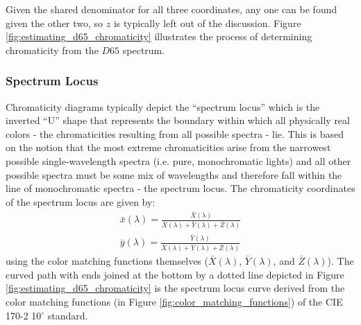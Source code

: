 \documentclass[twocolumn]{article}
\newif\ifinvert
\begin{document}
Given the shared denominator for all three coordinates, any one can be found given the other two, so $z$ is typically left out of the discussion.  Figure \ref{fig:estimating_d65_chromaticity} illustrates the process of determining chromaticity from the $D65$ spectrum.
\begin{figure*}[h]
    \ifinvert
        
    \else
        
    \fi
    \caption{Illustration of the estimation of chromaticity from a spectrum.  The three left panels show the products of the three color matching functions with the $D65$ spectrum.  The area shaded under each resulting curve is annotated within each panel by applying equation \ref{eq:tristimulus_from_spectrum}.  The right panel shows the resulting chromaticity coordinate $(x,y)$ for the CIE 170-2 10$^\circ$ space (slightly different from the typically used CIE 1931).  IMAGE LINK, CODE LINK}\label{fig:estimating_d65_chromaticity}
\end{figure*}
\subsubsection{Spectrum Locus}
Chromaticity diagrams typically depict the “spectrum locus” which is the inverted “U” shape that represents the boundary within which all physically real colors - the chromaticities resulting from all possible spectra - lie.  This is based on the notion that the most extreme chromaticities arise from the narrowest possible single-wavelength spectra (i.e. pure, monochromatic lights) and all other possible spectra must be some mix of wavelengths and therefore fall within the line of monochromatic spectra - the spectrum locus.  The chromaticity coordinates of the spectrum locus are given by:
\begin{equation}
    \begin{aligned}
        \bar{x}(\lambda)=\frac{\bar{X}(\lambda)}{\bar{X}(\lambda)+\bar{Y}(\lambda)+\bar{Z}(\lambda)}\\
        \bar{y}(\lambda)=\frac{\bar{Y}(\lambda)}{\bar{X}(\lambda)+\bar{Y}(\lambda)+\bar{Z}(\lambda)}
    \end{aligned}
\end{equation}
using the color matching functions themselves ($\bar{X}(\lambda)$, $\bar{Y}(\lambda)$, and $\bar{Z}(\lambda)$).  The curved path with ends joined at the bottom by a dotted line depicted in Figure \ref{fig:estimating_d65_chromaticity} is the spectrum locus curve derived from the color matching functions (in Figure \ref{fig:color_matching_functions}) of the CIE 170-2 10$^\circ$ standard.\\
\end{document}
